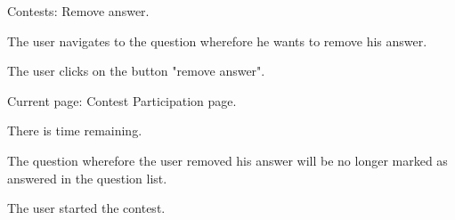 \begin{uc}{Contests: Remove answer.}

    \begin{uc-mss}
    \item The user navigates to the question wherefore he wants to remove his answer. 
    \item The user clicks on the button "remove answer".
    \end{uc-mss}

    \begin{uc-pre}
    \item Current page: Contest Participation page.
    \item There is time remaining.
    \end{uc-pre}

    \begin{uc-post}
    \item The question wherefore the user removed his answer will be no longer marked as answered in the question list.
    \end{uc-post}

    \begin{uc-trig}
    The user started the contest.
    \end{uc-trig}

\end{uc}

